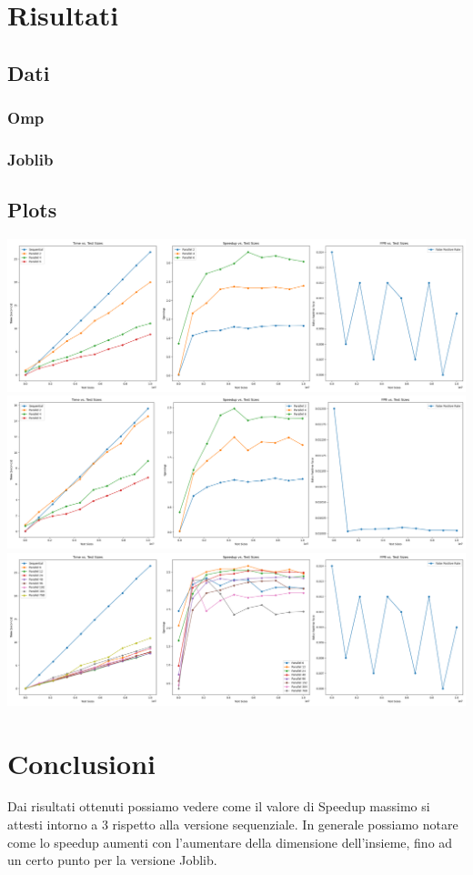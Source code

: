 \documentclass[11pt]{article}
\begin{document}
    \section{Risultati}\label{sec:risultati}
    \subsection{Dati}\label{subsec:dati}
    \subsubsection{Omp}\label{subsubsec:omp}
    \subsubsection{Joblib}\label{subsubsec:joblib}

    \subsection{Plots}\label{subsec:plots}
    \includegraphics[width=\textwidth]{plot_setup}
    \includegraphics[width=\textwidth]{plot_filter}
    \includegraphics[width=\textwidth]{plot_chunks}

    \clearpage

    \section{Conclusioni}\label{sec:conclusioni}
    Dai risultati ottenuti possiamo vedere come il valore di Speedup massimo si attesti intorno a 3 rispetto alla versione sequenziale.
    In generale possiamo notare come lo speedup aumenti con l'aumentare della dimensione dell'insieme, fino ad un certo punto per la versione Joblib.
\end{document}
